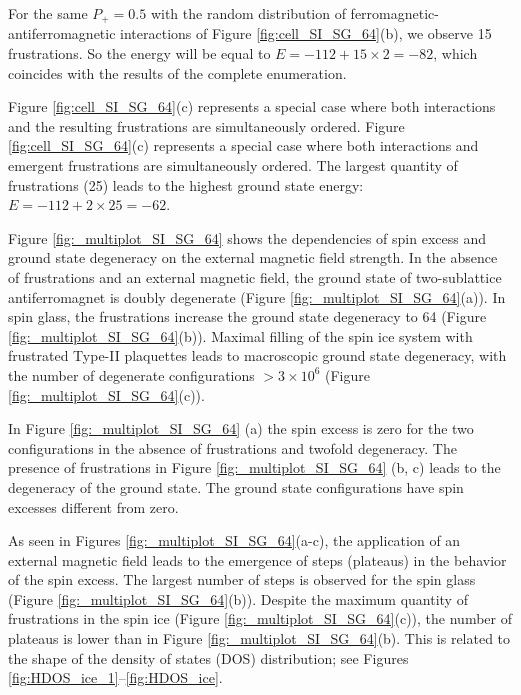 \documentclass[preprint,12pt]{elsarticle}
\begin{document}
	For the same $P_+ = 0.5$ with the random distribution of ferromagnetic-antiferromagnetic interactions of Figure \ref{fig:cell_SI_SG_64}(b), we observe 15 frustrations. So the energy will be equal to $E = -112 + 15\times2 = -82$, which coincides with the results of the complete enumeration.
	
	Figure \ref{fig:cell_SI_SG_64}(c) represents a special case where both interactions and the resulting frustrations are simultaneously ordered. Figure \ref{fig:cell_SI_SG_64}(c) represents a special case where both interactions and emergent frustrations are simultaneously ordered. The largest quantity of frustrations (25) leads to the highest ground state energy: $E = -112 + 2\times25 = -62$.
	
	Figure \ref{fig:_multiplot_SI_SG_64} shows the dependencies of spin excess and ground state degeneracy on the external magnetic field strength.
	In the absence of frustrations and an external magnetic field, the ground state of two-sublattice antiferromagnet is doubly degenerate (Figure \ref{fig:_multiplot_SI_SG_64}(a)).
	In spin glass, the frustrations increase the ground state degeneracy to 64 (Figure \ref{fig:_multiplot_SI_SG_64}(b)).
	Maximal filling of the spin ice system with frustrated Type-II plaquettes leads to macroscopic ground state degeneracy, with the number of degenerate configurations $> 3\times10^{6}$ (Figure \ref{fig:_multiplot_SI_SG_64}(c)).
	
	In Figure \ref{fig:_multiplot_SI_SG_64} (a) the spin excess is zero for the two configurations in the absence of frustrations and twofold degeneracy. The presence of frustrations in Figure \ref{fig:_multiplot_SI_SG_64} (b, c) leads to the degeneracy of the ground state. The ground state configurations have spin excesses different from zero.
	
	
	As seen in Figures \ref{fig:_multiplot_SI_SG_64}(a-c), the application of an external magnetic field leads to the emergence of steps (plateaus) in the behavior of the spin excess. The largest number of steps is observed for the spin glass (Figure \ref{fig:_multiplot_SI_SG_64}(b)). Despite the maximum quantity of frustrations in the spin ice (Figure \ref{fig:_multiplot_SI_SG_64}(c)), the number of plateaus is lower than in Figure \ref{fig:_multiplot_SI_SG_64}(b). This is related to the shape of the density of states (DOS) distribution; see Figures \ref{fig:HDOS_ice_1}–\ref{fig:HDOS_ice}.
	
\end{document}
